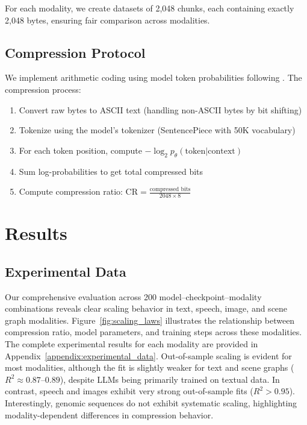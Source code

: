 \documentclass[10pt]{article} %
\begin{document}
For each modality, we create datasets of 2,048 chunks, each containing exactly 2,048 bytes, ensuring fair comparison across modalities.

\subsection{Compression Protocol}

We implement arithmetic coding using model token probabilities following \citet{deletang2024compression}. The compression process:

\begin{enumerate}
\item Convert raw bytes to ASCII text (handling non-ASCII bytes by bit shifting)
\item Tokenize using the model's tokenizer (SentencePiece with 50K vocabulary)
\item For each token position, compute $-\log_2 p_\theta(\text{token}|\text{context})$
\item Sum log-probabilities to get total compressed bits
\item Compute compression ratio: $\mathrm{CR} = \frac{\text{compressed bits}}{2048 \times 8}$
\end{enumerate}

\section{Results}

\subsection{Experimental Data}

Our comprehensive evaluation across 200 model–checkpoint–modality combinations reveals clear scaling behavior in text, speech, image, and scene graph modalities. Figure~\ref{fig:scaling_laws} illustrates the relationship between compression ratio, model parameters, and training steps across these modalities. The complete experimental results for each modality are provided in Appendix~\ref{appendix:experimental_data}. Out-of-sample scaling is evident for most modalities, although the fit is slightly weaker for text and scene graphs ($R^2 \approx 0.87\text{--}0.89$), despite LLMs being primarily trained on textual data. In contrast, speech and images exhibit very strong out-of-sample fits ($R^2 > 0.95$). Interestingly, genomic sequences do not exhibit systematic scaling, highlighting modality-dependent differences in compression behavior.
\end{document}
